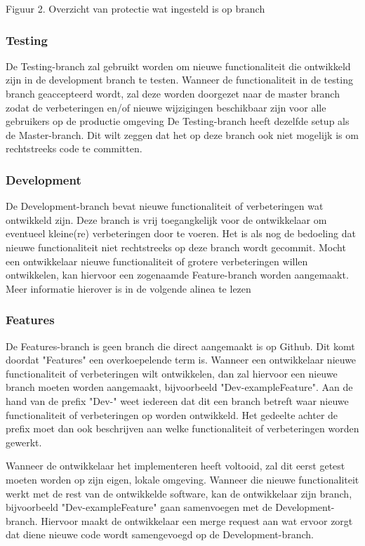\documentclass{article}
\begin{document}
	Figuur 2. Overzicht van protectie wat ingesteld is op branch
	
	\subsubsection{Testing}
	De Testing-branch zal gebruikt worden om nieuwe functionaliteit die ontwikkeld zijn in de development branch te testen. Wanneer de functionaliteit in de testing branch geaccepteerd wordt, zal deze worden doorgezet naar de master branch zodat de verbeteringen en/of nieuwe wijzigingen beschikbaar zijn voor alle gebruikers op de productie omgeving
	De Testing-branch heeft dezelfde setup als de Master-branch. Dit wilt zeggen dat het op deze branch ook niet mogelijk is om rechtstreeks code te committen.
	\subsubsection{Development}
	
	De Development-branch bevat nieuwe functionaliteit of verbeteringen wat ontwikkeld zijn. Deze branch is vrij toegangkelijk voor de ontwikkelaar om eventueel kleine(re) verbeteringen door te voeren.	
	Het is als nog de bedoeling dat nieuwe functionaliteit niet rechtstreeks op deze branch wordt gecommit. Mocht een ontwikkelaar nieuwe functionaliteit of grotere verbeteringen willen ontwikkelen, kan hiervoor een zogenaamde Feature-branch worden aangemaakt. Meer informatie hierover is in de volgende alinea te lezen
	
	\subsubsection{Features}
	De Features-branch is geen branch die direct aangemaakt is op Github. Dit komt doordat "Features" een overkoepelende term is. Wanneer een ontwikkelaar nieuwe functionaliteit of verbeteringen wilt ontwikkelen, dan zal hiervoor een nieuwe branch moeten worden aangemaakt, bijvoorbeeld "Dev-exampleFeature". Aan de hand van de prefix "Dev-" weet iedereen dat dit een branch betreft waar nieuwe functionaliteit of verbeteringen op worden ontwikkeld. Het gedeelte achter de prefix moet dan ook beschrijven aan welke functionaliteit of verbeteringen worden gewerkt.
	
	
	Wanneer de ontwikkelaar het implementeren heeft voltooid, zal dit eerst getest moeten worden op zijn eigen, lokale omgeving. Wanneer die nieuwe functionaliteit werkt met de rest van de ontwikkelde software, kan de ontwikkelaar zijn branch, bijvoorbeeld "Dev-exampleFeature" gaan samenvoegen met de Development-branch. Hiervoor maakt de ontwikkelaar een merge request aan wat ervoor zorgt dat diene nieuwe code wordt samengevoegd op de Development-branch.
\end{document}
